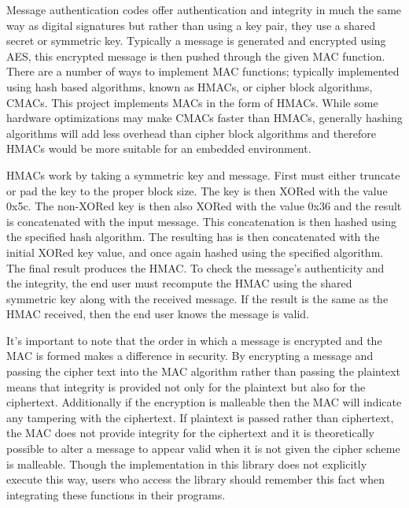 Message authentication codes offer authentication and integrity in much the same way as digital signatures but rather than using a key pair, they use a shared secret or symmetric key. Typically a message is generated and encrypted using AES, this encrypted message is then pushed through the given MAC function. There are a number of ways to implement MAC functions; typically implemented using hash based algorithms, known as HMACs, or cipher block algorithms, CMACs. This project implements MACs in the form of HMACs. While some hardware optimizations may make CMACs faster than HMACs, generally hashing algorithms will add less overhead than cipher block algorithms and therefore HMACs would be more suitable for an embedded environment. 

HMACs work by taking a symmetric key and message. First must either truncate or pad the key to the proper block size. The key is then XORed with the value 0x5c. The non-XORed key is then also XORed with the value 0x36 and the result is concatenated with the input  message. This concatenation is then hashed using the specified hash algorithm. The resulting has is then concatenated with the initial XORed key value, and once again hashed using the specified algorithm. The final result produces the HMAC. To check the message's authenticity and the integrity, the end user must recompute the HMAC using the shared symmetric key along with the received message. If the result is the same as the HMAC received, then the end user knows the message is valid.

It's important to note that the order in which a message is encrypted and the MAC is formed makes a difference in security. By encrypting a message and passing the cipher text into the MAC algorithm rather than passing the plaintext means that integrity is provided not only for the plaintext but also for the ciphertext. Additionally if the encryption is malleable then the MAC will indicate any tampering with the ciphertext. If plaintext is passed rather than ciphertext, the MAC does not provide integrity for the ciphertext and it is theoretically possible to alter a message to appear valid  when it is not given the cipher scheme is malleable.  Though the implementation in this library does not explicitly execute this way, users who access the library should remember this fact when integrating these functions in their programs.

